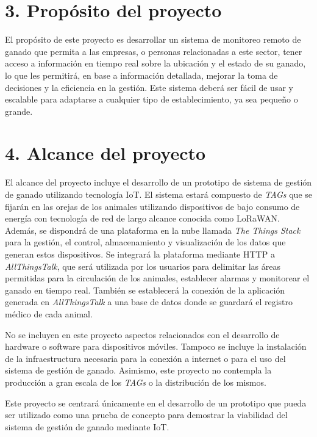 \documentclass[
11pt, %
]{charter}
\begin{document}
\section{3. Propósito del proyecto}
\label{sec:proposito}

El propósito de este proyecto es desarrollar un sistema de monitoreo remoto de ganado que permita a las empresas, o personas relacionadas a este sector, tener acceso a información en tiempo real sobre la ubicación y el estado de su ganado, lo que les permitirá, en base a información detallada, mejorar la toma de decisiones y la eficiencia en la gestión. Este sistema deberá ser fácil de usar y escalable para adaptarse a cualquier tipo de establecimiento, ya sea pequeño o grande.

\section{4. Alcance del proyecto}
\label{sec:alcance}

El alcance del proyecto incluye el desarrollo de un prototipo de sistema de gestión de ganado utilizando tecnología IoT. El sistema estará compuesto de \emph{TAGs} que se fijarán en las orejas de los animales utilizando dispositivos de bajo consumo de energía con tecnología de red de largo alcance conocida como LoRaWAN. Además, se dispondrá de una plataforma en la nube llamada \emph{The Things Stack} para la gestión, el control, almacenamiento y visualización de los datos que generan estos dispositivos. Se integrará la plataforma mediante HTTP a \emph{AllThingsTalk}, que será utilizada por los usuarios para delimitar las áreas permitidas para la circulación de los animales, establecer alarmas y monitorear el ganado en tiempo real. También se establecerá la conexión de la aplicación generada en \emph{AllThingsTalk} a una base de datos donde se guardará el registro médico de cada animal.

No se incluyen en este proyecto aspectos relacionados con el desarrollo de hardware o software para dispositivos móviles. Tampoco se incluye la instalación de la infraestructura necesaria para la conexión a internet o para el uso del sistema de gestión de ganado. Asimismo, este proyecto no contempla la producción a gran escala de los \emph{TAGs} o la distribución de los mismos. 

Este proyecto se centrará únicamente en el desarrollo de un prototipo que pueda ser utilizado como una prueba de concepto para demostrar la viabilidad del sistema de gestión de ganado mediante IoT.
\end{document}
